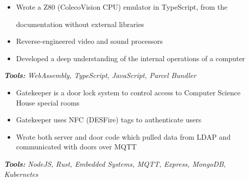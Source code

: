 \documentclass[10pt,letter]{altacv}
\begin{document}

\begin{fullwidth}
\marginpar{\makesidebarheader}
    \vspace*{-1\baselineskip}
\makecvheader
\end{fullwidth}

\bigskip
\smallskip


\begin{itemize}
\item Wrote a Z80 (ColecoVision CPU) emulator in TypeScript, from the

  documentation without external libraries
\item Reverse-engineered video and sound processors
\item Developed a deep understanding of the internal operations of a computer
\end{itemize}
\textit{\textbf{Tools:} WebAssembly, TypeScript, JavaScript, Parcel Bundler}

\divider
  
\begin{itemize}
\item Gatekeeper is a door lock system to control access to Computer Science House special rooms
\item Gatekeeper uses NFC (DESFire) tags to authenticate users
\item Wrote both server and door code which pulled data from LDAP and communicated with doors over MQTT
\end{itemize}
\textit{\textbf{Tools:} NodeJS, Rust, Embedded Systems, MQTT, Express, MongoDB, Kubernetes}
\end{document}
